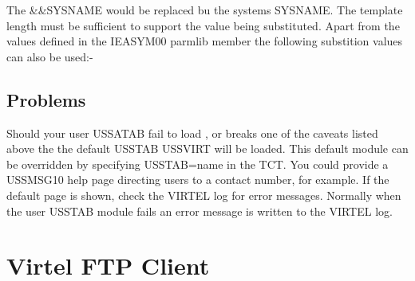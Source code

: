 \documentclass[letterpaper,10pt,english]{sphinxmanual}
\begin{document}
The \&\&SYSNAME would be replaced bu the systems SYSNAME. The template length must be sufficient to support the value being substituted. Apart from the values defined in the IEASYM00 parmlib member the following substition values can also be used:-

\begin{sphinxVerbatim}[commandchars=\\\{\}]
     
                           
                                  
                                  
                                
                                
\end{sphinxVerbatim}


\section{Problems}
\label{\detokenize{Customization:problems}}
Should your user USSATAB fail to load , or breaks one of the caveats listed above the the default USSTAB USSVIRT will be loaded. This default module can be overridden by specifying USSTAB=name in the TCT. You could provide a USSMSG10 help page directing users to a contact number, for example. If the default page is shown, check the VIRTEL log for error messages. Normally when the user USSTAB module fails an error message is written to the VIRTEL log.

\ignorespaces 

\chapter{Virtel FTP Client}
\label{\detokenize{Customization:virtel-ftp-client}}\label{\detokenize{Customization:index-129}}
\end{document}
